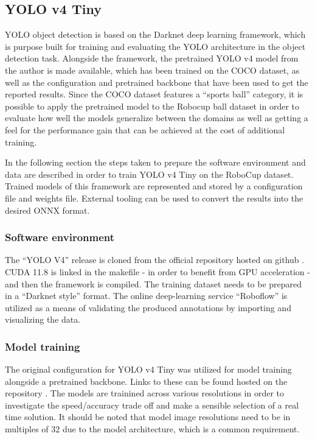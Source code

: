 \documentclass[a4paper,twoside,12pt]{report}
\begin{document}
\subsection{YOLO v4 Tiny}

YOLO object detection is based on the Darknet deep learning framework, which is purpose built for training and evaluating the YOLO architecture in the object detection task. Alongside the framework, the pretrained YOLO v4 model from the author is made available, which has been trained on the COCO dataset, as well as the configuration and pretrained backbone that have been used to get the reported results. Since the COCO dataset features a ``sports ball'' category, it is possible to apply the pretrained model to the Robocup ball dataset in order to evaluate how well the models generalize between the domains as well as getting a feel for the performance gain that can be achieved at the cost of additional training.

In the following section the steps taken to prepare the software environment and data are described in order to train YOLO v4 Tiny on the RoboCup dataset. Trained models of this framework are represented and stored by a configuration file and weights file. External tooling can be used to convert the results into the desired ONNX format. 

\subsubsection{Software environment}

 The ``YOLO V4'' release is cloned from the official repository hosted on github \citep{yolov4repo}. CUDA 11.8 is linked in the makefile - in order to benefit from GPU acceleration - and then the framework is compiled. The training dataset needs to be prepared in a ``Darknet style'' format. The online deep-learning service ``Roboflow'' \citep{roboflow} is utilized as a means of validating the produced annotations by importing and visualizing the data. 

\subsubsection{Model training}

The original configuration for YOLO v4 Tiny was utilized for model training alongside a pretrained backbone. Links to these can be found hosted on the repository \citep{yolov4repo}. The models are trainined across various resolutions in order to investigate the speed/accuracy trade off and make a sensible selection of a real time solution. It should be noted that model image resolutions need to be in multiples of 32 due to the model architecture, which is a common requirement.
\end{document}
